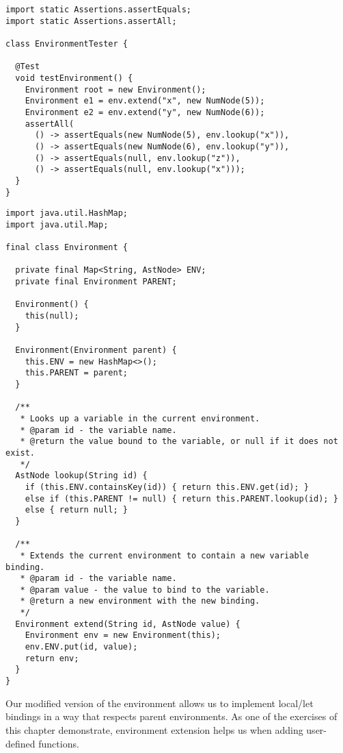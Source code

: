 \begin{lstlisting}[language=MyJava]
import static Assertions.assertEquals;
import static Assertions.assertAll;

class EnvironmentTester {
  
  @Test
  void testEnvironment() {
    Environment root = new Environment();
    Environment e1 = env.extend("x", new NumNode(5));
    Environment e2 = env.extend("y", new NumNode(6));
    assertAll(
      () -> assertEquals(new NumNode(5), env.lookup("x")),
      () -> assertEquals(new NumNode(6), env.lookup("y")),
      () -> assertEquals(null, env.lookup("z")),
      () -> assertEquals(null, env.lookup("x")));
  }
}
\end{lstlisting}
  
\enlargethispage{\baselineskip}
\begin{lstlisting}[language=MyJava]
import java.util.HashMap;
import java.util.Map;

final class Environment {

  private final Map<String, AstNode> ENV;
  private final Environment PARENT;

  Environment() { 
    this(null); 
  }

  Environment(Environment parent) { 
    this.ENV = new HashMap<>(); 
    this.PARENT = parent; 
  }

  /**
   * Looks up a variable in the current environment.
   * @param id - the variable name.
   * @return the value bound to the variable, or null if it does not exist.
   */
  AstNode lookup(String id) {
    if (this.ENV.containsKey(id)) { return this.ENV.get(id); } 
    else if (this.PARENT != null) { return this.PARENT.lookup(id); } 
    else { return null; }
  }

  /**
   * Extends the current environment to contain a new variable binding.
   * @param id - the variable name.
   * @param value - the value to bind to the variable.
   * @return a new environment with the new binding.
   */
  Environment extend(String id, AstNode value) {
    Environment env = new Environment(this);
    env.ENV.put(id, value);
    return env;
  }
}
\end{lstlisting} 

Our modified version of the environment allows us to implement local/let bindings in a way that respects parent environments. As one of the exercises of this chapter demonstrate, environment extension helps us when adding user-defined functions.

